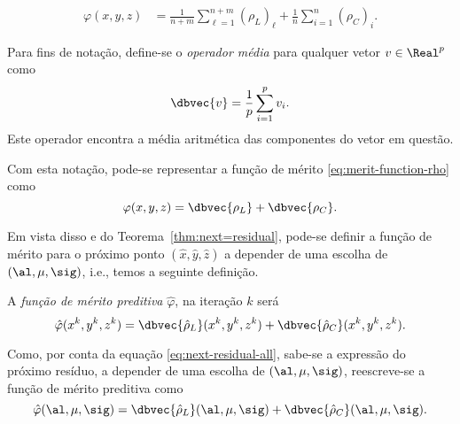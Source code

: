 \begin{align}
\varphi(x,y,z) & = \frac{1}{n+m}\sum_{\ell=1}^{n+m}(\rho_L)_\ell+ 
\frac{1}{n}\sum_{i=1}^{n}(\rho_C)_i.\label{eq:merit-function-rho}
\end{align}

Para fins de notação, define-se o \emph{operador média} para qualquer vetor
$v\in\Real^p$ como \[\dbvec{v} = \frac{1}{p}\sum_{i=1}^p v_i.\] Este operador
encontra a média aritmética das componentes do vetor em questão. 

Com esta notação, pode-se representar a função de mérito
\eqref{eq:merit-function-rho} como
\begin{equation}\label{eq:merit-function-as-sum-bar}
\varphi(x,y,z)  = \dbvec{\rho_L}+ 
\dbvec{\rho_C}.
\end{equation}

Em vista disso e do Teorema~\ref{thm:next=residual}, pode-se  definir a função
de mérito para o próximo ponto $(\hat{x},\hat{y},\hat{z})$ a depender de uma
escolha de $(\al,\mu,\sig)$, i.e., temos a seguinte definição.


\begin{defin} \label{def:predictive-merit-funcion}
A \emph{função de mérito preditiva}
$\hat{\varphi}$, na iteração $k$ será 
\begin{equation*}
\hat{\varphi}({x}^k,{y}^k, {z}^k) = \dbvec{\hat{\rho}_L}({x}^k,{y}^k, {z}^k)+
\dbvec{\hat{\rho}_C}({x}^k,{y}^k, {z}^k).
\end{equation*}

Como, por conta da equação \eqref{eq:next-residual-all}, sabe-se a expressão do
próximo resíduo,  a depender de uma escolha de $(\al,\mu,\sig)$, reescreve-se
a função de mérito preditiva como
\begin{equation}
\label{eq:merit-function}
\hat{\varphi}(\al,\mu,\sig) =
\dbvec{\hat{\rho}_L}(\al,\mu,\sig)+
\dbvec{\hat{\rho}_C}(\al,\mu,\sig).
\end{equation}
\end{defin}

